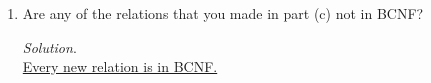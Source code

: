 \documentclass[10pt]{article}
\begin{document}
\begin{enumerate}
\begin{enumerate}
        \item Are any of the relations that you made in part (c) not in BCNF?
        
        \begin{mdframed}[leftmargin=-6.5mm]
        \textit{Solution}.\\
        \underline{Every new relation is in BCNF.}\\
        \newline
        

\end{mdframed}
\end{enumerate}
\end{enumerate}
\end{document}
